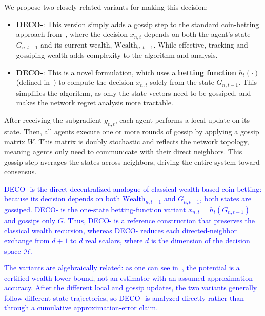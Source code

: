 \documentclass[journal]{IEEEtran}
\newcommand{\w}{\text{Wealth}}
\newcommand{\Hil}{\mathcal{H}} %
\newcommand{\algname}{{DECO}\xspace}
\begin{document}
We propose two closely related variants for making this decision:
\begin{itemize}
    \item \textbf{\algname{}-}: This version simply adds a gossip step to the standard coin-betting approach from~\cite{orabona_coin_2016}, where the decision $x_{n,t}$ depends on both the agent's state $G_{n,t-1}$ and its current wealth, $\w_{n,t-1}$.
          While effective, tracking and gossiping wealth adds complexity to the algorithm and analysis.
    \item \textbf{\algname{}-}: This is a novel formulation, which uses a \textbf{betting function} $h_t(\cdot)$ (defined in~) to compute the decision $x_{n,t}$ solely from the state $G_{n,t-1}$.
          This simplifies the algorithm, as only the state vectors need to be gossiped, and makes the network regret analysis more tractable.
\end{itemize}

After receiving the subgradient $g_{n,t}$, each agent performs a local update on its state.
Then, all agents execute one or more rounds of gossip by applying a gossip matrix $W$.
This matrix is doubly stochastic and reflects the network topology, meaning agents only need to communicate with their direct neighbors.
This gossip step averages the states across neighbors, driving the entire system toward consensus.

\textcolor{blue}{\algname{}- is the direct decentralized analogue of classical wealth-based coin betting: because its decision depends on both $\w_{n,t-1}$ and $G_{n,t-1}$, both states are gossiped.}
\textcolor{blue}{\algname{}- is the one-state betting-function variant $x_{n,t}=h_t(G_{n,t-1})$ and gossips only $G$.}
\textcolor{blue}{Thus, \algname{}- is a reference construction that preserves the classical wealth recursion, whereas \algname{}- reduces each directed-neighbor exchange from $d+1$ to $d$ real scalars, where $d$ is the dimension of the decision space $\Hil$.}

\textcolor{blue}{The variants are algebraically related: as one can see in~, the potential is a certified wealth lower bound, not an estimator with an assumed approximation accuracy. After the different local and gossip updates, the two variants generally follow different state trajectories, so \algname{}- is analyzed directly rather than through a cumulative approximation-error claim.}
\end{document}
